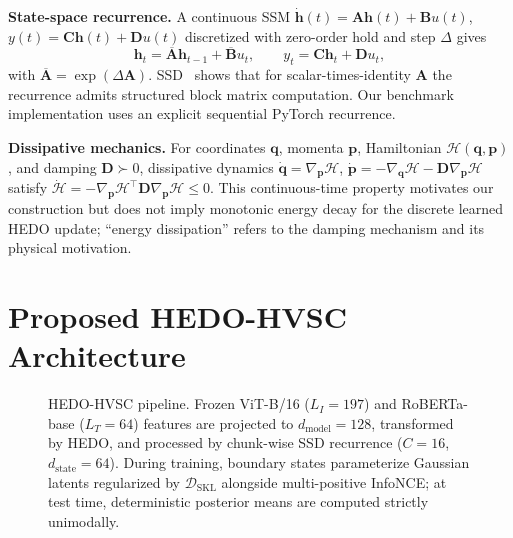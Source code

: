 \documentclass[pdflatex,sn-mathphys-num]{sn-jnl}
\begin{document}
\textbf{State-space recurrence.} A continuous SSM $\dot{\mathbf{h}}(t) = \mathbf{A}\mathbf{h}(t) + \mathbf{B}u(t)$, $y(t) = \mathbf{C}\mathbf{h}(t) + \mathbf{D}u(t)$ discretized with zero-order hold and step $\Delta$ gives
\begin{equation}
\mathbf{h}_t = \overline{\mathbf{A}} \mathbf{h}_{t-1} + \overline{\mathbf{B}} u_t, \qquad y_t = \mathbf{C} \mathbf{h}_t + \mathbf{D} u_t,
\end{equation}
with $\overline{\mathbf{A}} = \exp(\Delta \mathbf{A})$. SSD~\cite{dao2024transformers} shows that for scalar-times-identity $\mathbf{A}$ the recurrence admits structured block matrix computation. Our benchmark implementation uses an explicit sequential PyTorch recurrence.

\textbf{Dissipative mechanics.} For coordinates $\mathbf{q}$, momenta $\mathbf{p}$, Hamiltonian $\mathcal{H}(\mathbf{q}, \mathbf{p})$, and damping $\mathbf{D} \succ 0$, dissipative dynamics $\dot{\mathbf{q}} = \nabla_{\mathbf{p}}\mathcal{H}$, $\dot{\mathbf{p}} = -\nabla_{\mathbf{q}}\mathcal{H} - \mathbf{D}\nabla_{\mathbf{p}}\mathcal{H}$ satisfy $\dot{\mathcal{H}} = -\nabla_{\mathbf{p}}\mathcal{H}^\top \mathbf{D} \nabla_{\mathbf{p}}\mathcal{H} \le 0$. This continuous-time property motivates our construction but does not imply monotonic energy decay for the discrete learned HEDO update; ``energy dissipation'' refers to the damping mechanism and its physical motivation.

\section{Proposed HEDO-HVSC Architecture}
\label{sec:methodology}

\begin{figure}[!htbp]
\centering
\resizebox{!}{0.6\textheight}{\HEDOArchitectureFigure}
\caption{HEDO-HVSC pipeline. Frozen ViT-B/16 ($L_I=197$) and RoBERTa-base ($L_T=64$) features are projected to $d_{\text{model}}=128$, transformed by HEDO, and processed by chunk-wise SSD recurrence ($C=16$, $d_{\text{state}}=64$). During training, boundary states parameterize Gaussian latents regularized by $\mathcal{D}_{\text{SKL}}$ alongside multi-positive InfoNCE; at test time, deterministic posterior means are computed strictly unimodally.}
\label{fig:overall_architecture}
\end{figure}
\end{document}
